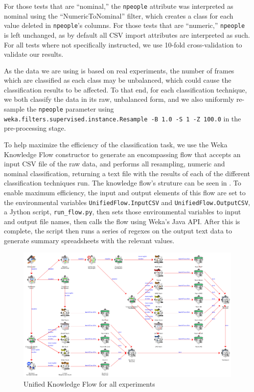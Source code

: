 \documentclass[../thesis/thesis.tex]{subfiles}
\begin{document}
For those tests that are ``nominal,'' the \texttt{npeople} attribute was interpreted as nominal using the ``NumericToNominal'' filter, which creates a class for each value deleted in \texttt{npeople}'s columns. For those tests that are ``numeric,'' \texttt{npeople} is left unchanged, as by default all CSV import attributes are interpreted as such. For all tests where not specifically instructed, we use 10-fold cross-validation to validate our results.

As the data we are using is based on real experiments, the number of frames which are classified as each class may be unbalanced, which could cause the classification results to be affected. To that end, for each classification technique, we both classify the data in its raw, unbalanced form, and we also uniformly re-sample the \texttt{npeople} parameter using \texttt{weka.filters.supervised.instance.Resample -B 1.0 -S 1 -Z 100.0} in the pre-processing stage.

To help maximize the efficiency of the classification task, we use the Weka Knowledge Flow constructor to generate an encompassing flow that accepts an input CSV file of the raw data, and performs all resampling, numeric and nominal classification, returning a text file with the results of each of the different classification techniques run. The knowledge flow's struture can be seen in \label{fig:methods:unifiedflow}. To enable maximum efficiency, the input and output elements of this flow are set to the environmental variables \texttt{UnifiedFlow.InputCSV} and \texttt{UnifiedFlow.OutputCSV}, a Jython script, \texttt{run\_flow.py}, then sets those environmental variables to input and output file names, then calls the flow using Weka's Java API. After this is complete, the script then runs a series of regexes on the output text data to generate summary spreadsheets with the relevant values.

\begin{landscape}
\begin{figure}
\centering
\includegraphics[width=0.95\linewidth]{../diagrams/unified-flow.png}
\caption{Unified Knowledge Flow for all experiments}
\label{fig:methods:unifiedflow}
\end{figure}
\end{landscape}
\end{document}
